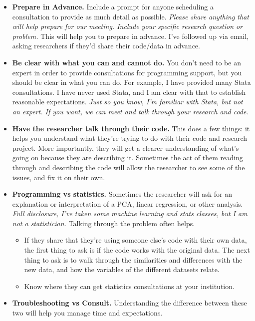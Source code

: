 \documentclass[
]{book}
\providecommand{\tightlist}{%
  \setlength{\itemsep}{0pt}\setlength{\parskip}{0pt}}
\begin{document}
\begin{itemize}
\tightlist
\item
  \textbf{Prepare in Advance.} Include a prompt for anyone scheduling a consultation to provide as much detail as possible. \emph{Please share anything that will help prepare for our meeting. Include your specific research question or problem.} This will help you to prepare in advance. I've followed up via email, asking researchers if they'd share their code/data in advance.
\item
  \textbf{Be clear with what you can and cannot do.} You don't need to be an expert
  in order to provide consultations for programming support, but you should be
  clear in what you can do. For example, I have provided many Stata
  consultations. I have never used Stata, and I am clear with that to establish
  reasonable expectations. \emph{Just so you know, I'm familiar with Stata, but not an
  expert. If you want, we can meet and talk through your research and code.}
\item
  \textbf{Have the researcher talk through their code.} This does a few things: it
  helps you understand what they're trying to do with their code and research
  project. More importantly, they will get a clearer understanding of what's going
  on because they are describing it. Sometimes the act of them reading through
  and describing the code will allow the researcher to see some of the issues,
  and fix it on their own.
\item
  \textbf{Programming vs statistics.} Sometimes the researcher will ask for an
  explanation or interpretation of a PCA, linear regression, or other analysis.
  \emph{Full disclosure, I've taken some machine learning and stats classes, but I am
  not a statistician.} Talking through the problem often helps.

  \begin{itemize}
  \tightlist
  \item
    If they share that they're using someone else's code with their own data,
    the first thing to ask is if the code works with the original data. The next
    thing to ask is to walk through the similarities and differences
    with the new data, and how the variables of the different datasets relate.
  \item
    Know where they can get statistics consultations at your institution.
  \end{itemize}
\item
  \textbf{Troubleshooting vs Consult.} Understanding the difference between these two
  will help you manage time and expectations.


\end{itemize}
\end{document}

